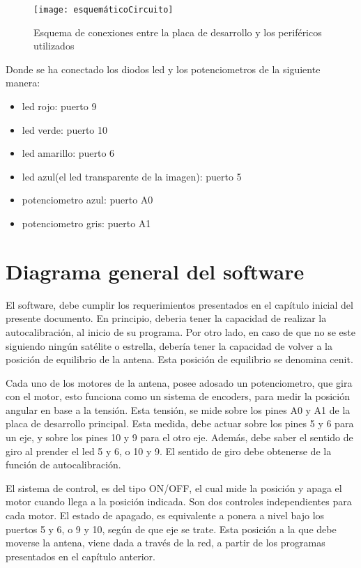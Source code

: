 \begin{figure}[p]
	\centering 
	\texttt{[image: esquemáticoCircuito]}
	\caption{Esquema de conexiones entre la placa de desarrollo y los periféricos utilizados} 
	\label{fig:esq_completo} 
\end{figure}

Donde se ha conectado los diodos led y los potenciometros de la siguiente manera: 
\begin{itemize}
	\label{item:prototipo_leds_pote}
	\item led rojo: puerto 9 
	\item led verde: puerto 10 
	\item led amarillo: puerto 6 
	\item led azul(el led transparente de la imagen): puerto 5 
	\item potenciometro azul: puerto A0 
	\item potenciometro gris: puerto A1 
	
\end{itemize}


\section{Diagrama general del software}

El software, debe cumplir los requerimientos presentados en el capítulo inicial del presente documento. En principio, deberia tener la capacidad de realizar la autocalibración, al inicio de su programa. Por otro lado, en caso  de que no se este siguiendo ningún satélite o estrella, debería tener la capacidad de volver a la posición de equilibrio de la antena. Esta posición de equilibrio se denomina cenit. 

Cada uno de los motores de la antena, posee adosado un potenciometro, que gira con el motor, esto funciona como un sistema de encoders, para medir la posición angular en base a la tensión. Esta tensión, se mide sobre los pines A0 y A1 de la placa de desarrollo principal. Esta medida, debe actuar sobre los pines 5 y 6 para un eje, y sobre los pines 10 y 9 para el otro eje. Además, debe saber el sentido de giro al prender el led 5 y 6, o 10 y 9. El sentido de giro debe obtenerse de la función de autocalibración.  

El sistema de control, es del tipo ON/OFF, el cual mide la posición y apaga el motor cuando llega a la posición indicada. Son dos controles independientes para cada motor. El estado de apagado, es equivalente a ponera a nivel bajo los puertos 5 y 6, o 9 y 10, según  de que eje se trate. Esta posición a la que debe moverse la antena, viene dada a través de la red, a partir de los programas presentados en el capítulo anterior. 

